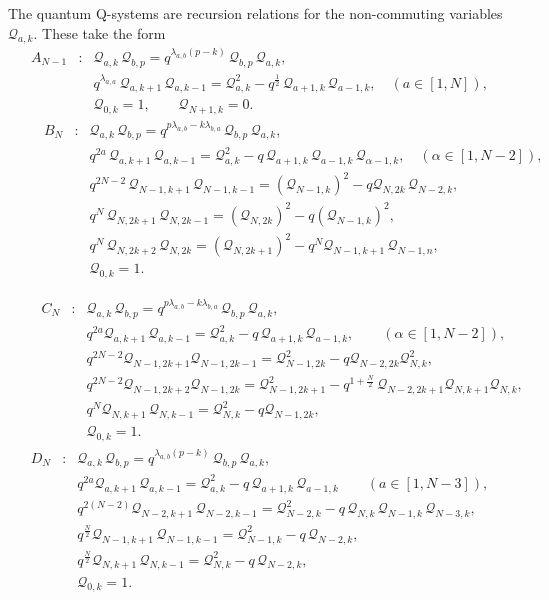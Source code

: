 \documentclass[12pt]{amsart}
\newcommand{\Q}{{\mathcal Q}}
\newcommand{\al}{{\alpha}}
\numberwithin{equation}{section}
\numberwithin{table}{section}
\begin{document}
The quantum Q-systems are recursion relations for the non-commuting variables $\Q_{a,k}$. These take the form
\begin{eqnarray}\label{ANqqsys}\!\!\!\!\!\!\!\!\!\!\!\!\!\!\!\!\!\!\!\!\!\!\!\!\!\!\!\!\!\!\!\!\!\!\!\!\!\!\!\!A_{N-1}&:&
\Q_{a,k}\, \Q_{b,p}=q^{\lambda_{a,b}(p-k)} \, \Q_{b,p}\,\Q_{a,k} ,\nonumber \\
&&q^{\lambda_{a,a}} \, \Q_{a,k+1}\,\Q_{a,k-1}= \Q_{a,k}^2-q^{\frac{1}{2}} \,\Q_{a+1,k}\,\Q_{a-1,k},\quad (a\in [1,N]) ,
 \\
\nonumber&&\Q_{0,k}=1, \qquad \Q_{N+1,k}=0.
\end{eqnarray}
%
\begin{eqnarray}\quad\quad\,  B_N&:&
\Q_{a,k}\, \Q_{b,p}= q^{p \lambda_{a,b}-k \lambda_{b,a}}\, \Q_{b,p}\, \Q_{a,k},\nonumber \\
&&q^{2a} \,\Q_{a,k+1}\,\Q_{a,k-1}=\Q_{a,k}^2-q\, \Q_{a+1,k}\,\Q_{a-1,k}\, \Q_{\al-1,k},\quad (\al\in [1,N-2]),\nonumber \\
&&q^{2N-2} \,\Q_{N-1,k+1}\,\Q_{N-1,k-1}=(\Q_{N-1,k})^2-q \Q_{N,2k}\, \Q_{N-2,k}, \label{BNqqsys}\\
&&q^N\, \Q_{N,2k+1}\,\Q_{N,2k-1}= (\Q_{N,2k})^2 -q (\Q_{N-1,k})^2,\nonumber \\
&&q^N\, \Q_{N,2k+2}\,\Q_{N,2k}= (\Q_{N,2k+1})^2 -q^{N} \Q_{N-1,k+1}\,\Q_{N-1,n}, \nonumber \\
&&\Q_{0,k}=1. \nonumber
\end{eqnarray}

\begin{eqnarray}\quad\quad C_N&:&
\Q_{a,k}\, \Q_{b,p}=
q^{p \lambda_{a,b} -k \lambda_{b,a}}\, 
\Q_{b,p}\, \Q_{a,k},\nonumber \\
&&q^{2a} \Q_{a,k+1}\,\Q_{a,k-1}=\Q_{a,k}^2-q \,\Q_{a+1,k}\,\Q_{a-1,k} ,\qquad (\al\in[1,N-2]),\nonumber\\
&&q^{2N-2} \Q_{N-1,2k+1}\Q_{N-1,2k-1}=\Q_{N-1,2k}^2 -q  \Q_{N-2,2k} \Q_{N,k}^2, \label{CNqqsys}\\
&&q^{2N-2} \Q_{N-1,2k+2}\Q_{N-1,2k}=\Q_{N-1,2k+1}^2 - q^{1+\frac{N}{2}}\,\Q_{N-2,2k+1} \Q_{N,k+1}\Q_{N,k}, \nonumber\\
&&q^N \Q_{N,k+1}\,\Q_{N,k-1}= \Q_{N,k}^2- q \Q_{N-1,2k},\nonumber \\
&&\Q_{0,k}=1. \nonumber
\end{eqnarray}
\begin{eqnarray}
D_N&:&
\Q_{a,k}\, \Q_{b,p}=q^{\lambda_{a,b}(p-k)}\, \Q_{b,p}\, \Q_{a,k},\nonumber \\
&&q^{2a}\Q_{a,k+1}\,\Q_{a,k-1}=\Q_{a,k}^2-q\, \Q_{a+1,k}\,\Q_{a-1,k}\qquad (a\in [1,N-3]),\nonumber \\
&&q^{2(N-2)}\Q_{N-2,k+1}\,\Q_{N-2,k-1}= \Q_{N-2,k}^2-q\,  \Q_{N,k}\,\Q_{N-1,k}\,\Q_{N-3,k} ,\\
&&q^{\frac{N}{2}}\Q_{N-1,k+1}\,\Q_{N-1,k-1}= \Q_{N-1,k}^2-q\,  \Q_{N-2,k},\nonumber \\
&&q^{\frac{N}{2}}\Q_{N,k+1}\,\Q_{N,k-1}= \Q_{N,k}^2-q\,  \Q_{N-2,k} ,\nonumber \\
&&\Q_{0,k}=1. \nonumber\label{DNqqsys}
\end{eqnarray}
\end{document}
